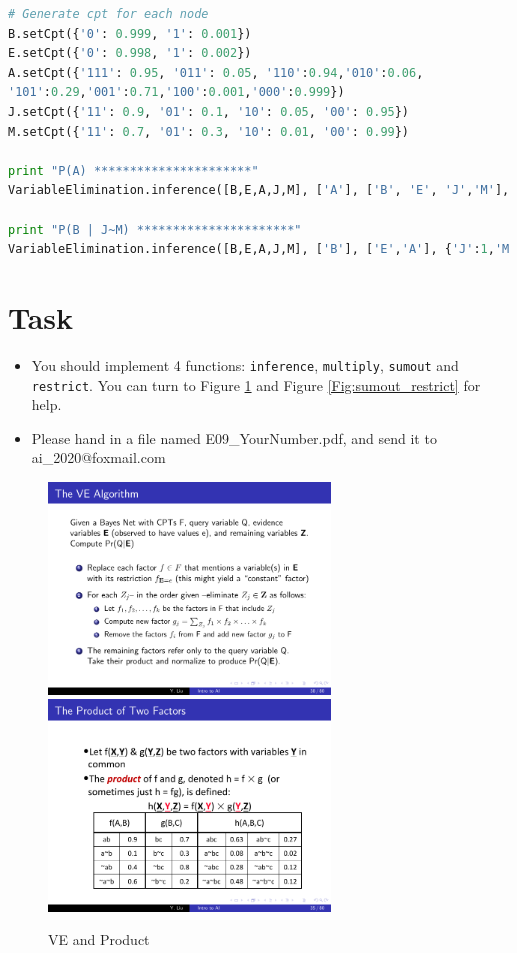 \documentclass[a4paper, 11pt]{article}
\begin{document}
\begin{lstlisting}[language=Python,frame=single]
# Generate cpt for each node
B.setCpt({'0': 0.999, '1': 0.001})
E.setCpt({'0': 0.998, '1': 0.002})
A.setCpt({'111': 0.95, '011': 0.05, '110':0.94,'010':0.06,
'101':0.29,'001':0.71,'100':0.001,'000':0.999})
J.setCpt({'11': 0.9, '01': 0.1, '10': 0.05, '00': 0.95})
M.setCpt({'11': 0.7, '01': 0.3, '10': 0.01, '00': 0.99})

print "P(A) **********************"
VariableElimination.inference([B,E,A,J,M], ['A'], ['B', 'E', 'J','M'], {})

print "P(B | J~M) **********************"
VariableElimination.inference([B,E,A,J,M], ['B'], ['E','A'], {'J':1,'M':0})
\end{lstlisting}
\section{Task}
\begin{itemize}
\item You should implement 4 functions: \texttt{inference}, \texttt{multiply}, \texttt{sumout} and \texttt{restrict}. You can turn to Figure \ref{Fig:ve_product} and Figure \ref{Fig:sumout_restrict} for help. 
\item Please hand in a file named \textsf{E09\_YourNumber.pdf}, and send it to \textsf{ai\_2020@foxmail.com}
\end{itemize}


\begin{figure}[ht]{}
\centering
\includegraphics[width=7.5cm]{Pic/ve}
\qquad
\includegraphics[width=7.5cm]{Pic/product}
\caption{VE and Product}
\label{Fig:ve_product}
\end{figure}
\end{document}
